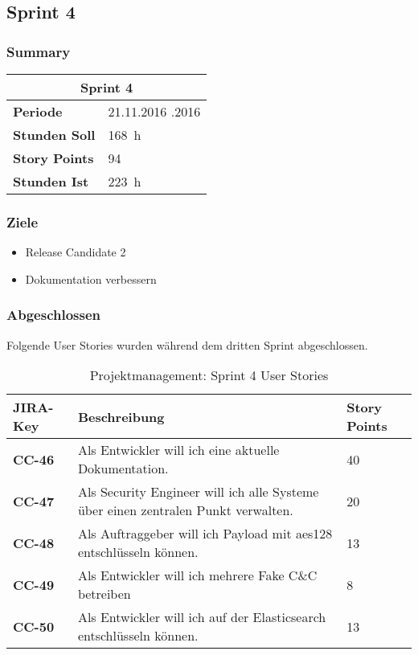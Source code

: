 \subsection{Sprint 4}

\subsubsection*{Summary}

\begin{table}[H]
	\centering
	\begin{tabular}{ll}
		\toprule
		\multicolumn{2}{c}{\textbf{Sprint 4}}\\
		\midrule
		\textbf{Periode} & 21.11.2016 \textendash 11.12.2016\\
		\textbf{Stunden Soll} & \SI{168}{\hour}\\
		\textbf{Story Points} & 94\\
		\textbf{Stunden Ist} & \SI{223}{\hour}\\
		\bottomrule
	\end{tabular}
\end{table}

\subsubsection*{Ziele}
\begin{itemize}
  \item Release Candidate 2
  \item Dokumentation verbessern
\end{itemize}


\subsubsection*{Abgeschlossen}
Folgende User Stories wurden während dem dritten Sprint abgeschlossen.
\begin{table}[H]
    \centering
	\begin{tabularx}{\textwidth}{l X l}
       \toprule
        \textbf{JIRA-Key} & \textbf{Beschreibung} & \textbf{Story Points}\\ \hline
  	  \midrule
      \textbf{CC-46} & 	Als Entwickler will ich eine aktuelle Dokumentation. & 40 \\
      \textbf{CC-47} & Als Security Engineer will ich alle Systeme über einen zentralen Punkt verwalten. & 20\\
      \textbf{CC-48} & Als Auftraggeber will ich Payload mit \gls{aes128} entschlüsseln können. & 13\\
      \textbf{CC-49} & Als Entwickler will ich mehrere Fake C\&C betreiben & 8 \\
      \textbf{CC-50} & Als Entwickler will ich auf der Elasticsearch entschlüsseln können. & 13 \\
	\bottomrule  
    \end{tabularx}
    \caption{Projektmanagement: Sprint 4 User Stories}
\end{table}


